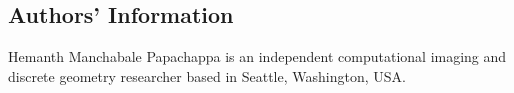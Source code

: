 \documentclass[11pt]{article}
\begin{document}
\subsection*{Authors' Information}
Hemanth Manchabale Papachappa is an independent computational imaging and discrete geometry researcher based in Seattle, Washington, USA.



\end{document}
